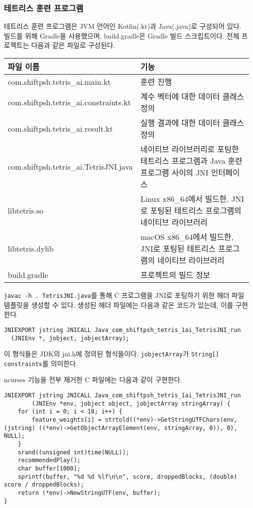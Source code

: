 \subsubsection{테트리스 훈련 프로그램}
테트리스 훈련 프로그램은 JVM 언어인 Kotlin(.kt)과 Java(.java)로 구성되어 있다. 빌드를 위해 Gradle을 사용했으며, build.gradle은 Gradle 빌드 스크립트이다.
전체 프로젝트는 다음과 같은 파일로 구성된다.

\begin{tabularx}{\linewidth}{l|X}
    파일 이름 & 기능 \\
    \hline
    com.shiftpsh.tetris\_ai.main.kt & 훈련 진행 \\
    com.shiftpsh.tetris\_ai.constraints.kt & 계수 벡터에 대한 데이터 클래스 정의 \\
    com.shiftpsh.tetris\_ai.result.kt & 실행 결과에 대한 데이터 클래스 정의 \\
    \hline
    com.shiftpsh.tetris\_ai.TetrisJNI.java & 네이티브 라이브러리로 포팅한 테트리스 프로그램과 Java 훈련 프로그램 사이의 JNI 인터페이스 \\
    \hline
    libtetris.so & Linux x86\_64에서 빌드한, JNI로 포팅된 테트리스 프로그램의 네이티브 라이브러리 \\
    libtetris.dylib & macOS x86\_64에서 빌드한, JNI로 포팅된 테트리스 프로그램의 네이티브 라이브러리 \\
    \hline
    build.gradle & 프로젝트의 빌드 정보 \\
\end{tabularx}

\texttt{javac -h . TetrisJNI.java}를 통해 C 프로그램을 JNI로 포팅하기 위한 헤더 파일 템플릿을 생성할 수 있다.\cite{JNI}
생성된 헤더 파일에는 다음과 같은 코드가 있는데, 이를 구현한다.

\begin{verbatim}
JNIEXPORT jstring JNICALL Java_com_shiftpsh_tetris_1ai_TetrisJNI_run
  (JNIEnv *, jobject, jobjectArray);
\end{verbatim}

이 형식들은 JDK의 jni.h에 정의된 형식들이다. \texttt{jobjectArray}가 \texttt{String[] constraints}를 의미한다.

ncurses 기능을 전부 제거한 C 파일에는 다음과 같이 구현한다.

\begin{verbatim}
JNIEXPORT jstring JNICALL Java_com_shiftpsh_tetris_1ai_TetrisJNI_run
        (JNIEnv *env, jobject object, jobjectArray stringArray) {
    for (int i = 0; i < 18; i++) {
        feature_weights[i] = strtold((*env)->GetStringUTFChars(env, (jstring) ((*env)->GetObjectArrayElement(env, stringArray, 0)), 0), NULL);
    }
    srand((unsigned int)time(NULL));
    recommendedPlay();
    char buffer[1000];
    sprintf(buffer, "%d %d %lf\n\n", score, droppedBlocks, (double) score / droppedBlocks);
    return (*env)->NewStringUTF(env, buffer);
}
\end{verbatim}

